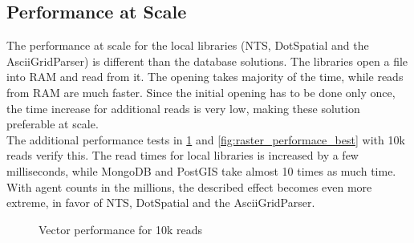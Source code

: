 \subsection{Performance at Scale}
The performance at scale for the local libraries (NTS, DotSpatial and the AsciiGridParser) is different than the database solutions. The libraries open a file into RAM and read from it. The opening takes majority of the time, while reads from RAM are much faster. Since the initial opening has to be done only once, the time increase for additional reads is very low, making these solution preferable at scale.\\
The additional performance tests in \ref{fig:vector_performace_best} and \ref{fig:raster_performace_best} with 10k reads verify this. The read times for local libraries is increased by a few milliseconds, while MongoDB and PostGIS take almost 10 times as much time. With agent counts in the millions, the described effect becomes even more extreme, in favor of NTS, DotSpatial and the AsciiGridParser.


\begin{figure}[H]
	\caption{Vector performance for 10k reads}
	\label{fig:vector_performace_best}
\end{figure}

